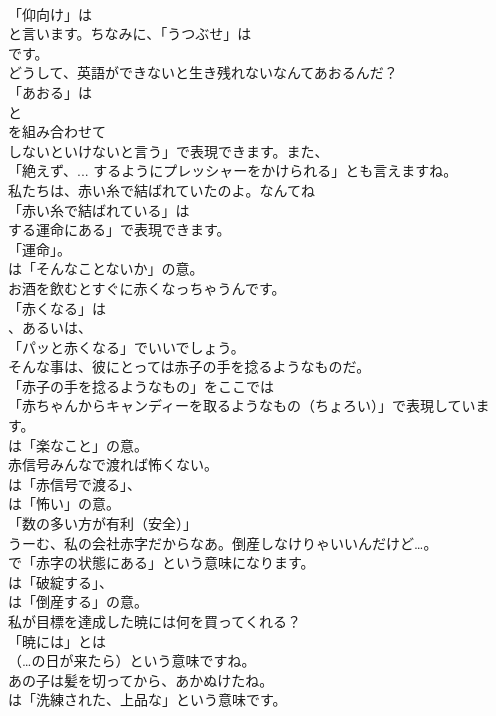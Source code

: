 \documentclass[8pt]{extreport}
\begin{document}
\begin{CJK}{UTF8}{min}
\\	「仰向け」は
\\	と言います。ちなみに、「うつぶせ」は
\\	です。	
\\	どうして、英語ができないと生き残れないなんてあおるんだ？ 
\\	「あおる」は
\\	と
\\	を組み合わせて
\\	しないといけないと言う」で表現できます。また、
\\	「絶えず、... するようにプレッシャーをかけられる」とも言えますね。	
\\	私たちは、赤い糸で結ばれていたのよ。なんてね 
\\	「赤い糸で結ばれている」は
\\	する運命にある」で表現できます。
\\	「運命」。
\\	は「そんなことないか」の意。	
\\	お酒を飲むとすぐに赤くなっちゃうんです。 
\\	「赤くなる」は
\\	、あるいは、
\\	「パッと赤くなる」でいいでしょう。	
\\	そんな事は、彼にとっては赤子の手を捻るようなものだ。 
\\	「赤子の手を捻るようなもの」をここでは
\\	「赤ちゃんからキャンディーを取るようなもの（ちょろい）」で表現しています。
\\	は「楽なこと」の意。	
\\	赤信号みんなで渡れば怖くない。 
\\	は「赤信号で渡る」、
\\	は「怖い」の意。
\\	「数の多い方が有利（安全）」	
\\	うーむ、私の会社赤字だからなあ。倒産しなけりゃいいんだけど…。 
\\	で「赤字の状態にある」という意味になります。
\\	は「破綻する」、
\\	は「倒産する」の意。	
\\	私が目標を達成した暁には何を買ってくれる？ 
\\	「暁には」とは 
\\	（…の日が来たら）という意味ですね。	
\\	あの子は髪を切ってから、あかぬけたね。 
\\	は「洗練された、上品な」という意味です。

\end{CJK}
\end{document}

